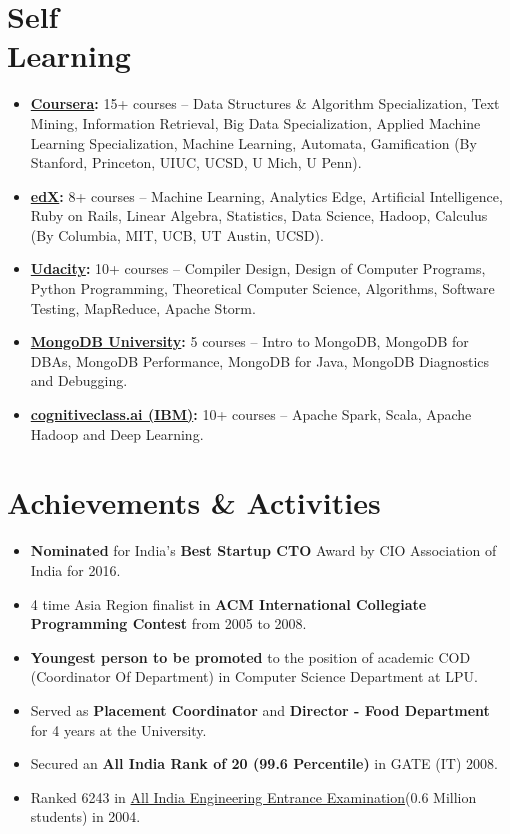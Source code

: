 \documentclass{article}
\begin{document}
\section{Self \\  Learning }
\begin{itemize}[leftmargin=-1ex]\setlength\itemsep{0.25em}\vspace{-10pt}
\item \textbf{\href{https://www.coursera.org/}{Coursera}:} 15+ courses -- Data Structures \& Algorithm Specialization, Text Mining, Information Retrieval, Big Data Specialization, Applied Machine Learning Specialization, Machine Learning, Automata, Gamification (By Stanford, Princeton, UIUC, UCSD, U Mich, U Penn).
\item \textbf{\href{https://www.edx.org/}{edX}:} 8+ courses -- Machine Learning, Analytics Edge, Artificial Intelligence, Ruby on Rails, Linear Algebra, Statistics, Data Science, Hadoop, Calculus (By Columbia, MIT, UCB, UT Austin, UCSD).
\item \textbf{\href{https://www.udacity.com/}{Udacity}:} 10+ courses -- Compiler Design, Design of Computer Programs, Python Programming, Theoretical Computer Science, Algorithms, Software Testing, MapReduce, Apache Storm.
\item \textbf{\href{https://university.mongodb.com/}{MongoDB University}:} 5 courses -- Intro to MongoDB, MongoDB for DBAs, MongoDB Performance, MongoDB for Java, MongoDB Diagnostics and Debugging.
\item \textbf{\href{https://cognitiveclass.ai/}{cognitiveclass.ai (IBM)}:} 10+ courses -- Apache Spark, Scala, Apache Hadoop and Deep Learning.
\end{itemize}
	
\section{Achievements  \& Activities}
\begin{itemize}[leftmargin=-0.1ex]\setlength\itemsep{0.25em}\vspace{-10pt}
\item \textbf{Nominated} for India's \textbf{Best Startup CTO} Award by CIO Association of India for 2016.	
\item 4 time Asia Region finalist in \textbf{ACM International Collegiate Programming Contest} from 2005 to 2008.
\item\textbf{Youngest person to be promoted} to the position of academic COD (Coordinator Of  Department) in Computer Science Department at LPU.
\item Served as \textbf{Placement Coordinator} and \textbf{Director - Food Department} for 4 years at the University.
\item Secured an \textbf{All India Rank of 20 (99.6 Percentile)} in GATE (IT) 2008.
\item Ranked 6243 in \href{https://en.wikipedia.org/wiki/Joint_Entrance_Examination_(Main)}{All India Engineering Entrance Examination}(0.6 Million students) in 2004.
\end{itemize}
	
\end{document}

